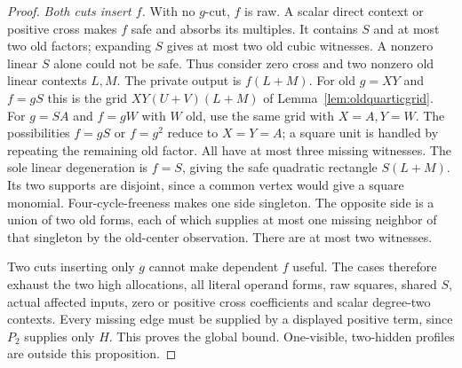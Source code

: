 \documentclass[11pt]{article}
\theoremstyle{definition}
\theoremstyle{remark}
\begin{document}
\begin{proof}
\emph{Both cuts insert $f$.} With no $g$-cut, $f$ is raw. A scalar
direct context or positive cross makes $f$ safe and absorbs its multiples.
It contains $S$ and at most two old factors; expanding $S$ gives at most
two old cubic witnesses. A nonzero linear $S$ alone could not be safe.
Thus consider zero cross and two nonzero old linear contexts $L,M$.
The private output is $f(L+M)$. For old $g=XY$ and $f=gS$ this is the
grid $XY(U+V)(L+M)$ of Lemma~\ref{lem:oldquarticgrid}.
For $g=SA$ and $f=gW$ with $W$ old, use the same grid with
$X=A,Y=W$. The possibilities $f=gS$ or $f=g^2$ reduce to $X=Y=A$;
a square unit is handled by repeating the remaining old factor.
All have at most three missing witnesses.
The sole linear degeneration is $f=S$, giving the safe quadratic
rectangle $S(L+M)$. Its two supports are disjoint, since a common vertex
would give a square monomial. Four-cycle-freeness makes one side singleton.
The opposite side is a union of two old forms, each of which supplies at
most one missing neighbor of that singleton by the old-center observation.
There are at most two witnesses.

Two cuts inserting only $g$ cannot make dependent $f$ useful. The cases
therefore exhaust the two high allocations, all literal operand forms,
raw squares, shared $S$, actual affected inputs, zero or positive cross
coefficients and scalar degree-two contexts. Every missing edge must be
supplied by a displayed positive term, since $P_2$ supplies only $H$.
This proves the global bound. One-visible, two-hidden profiles are outside
this proposition.
\end{proof}
\end{document}
